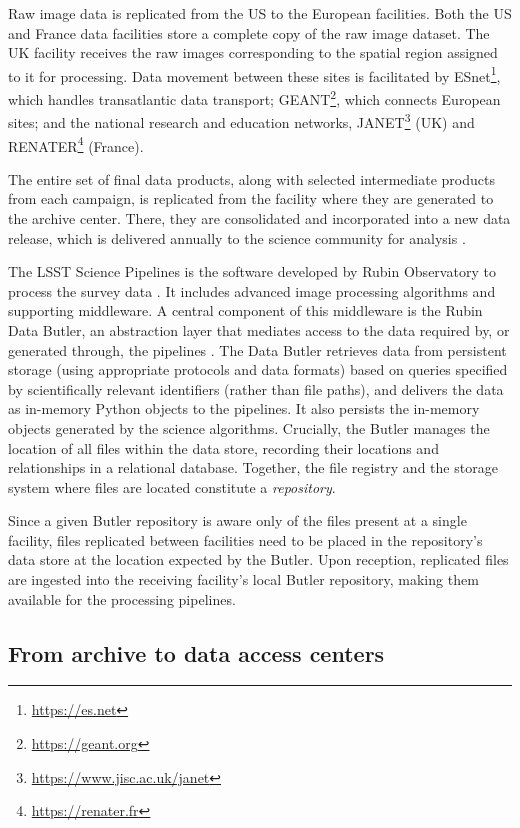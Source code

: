 \documentclass{webofc}
\begin{document}
Raw image data is replicated from the US to the European facilities. Both the US and France data facilities store a complete copy of the raw image dataset. The UK facility receives the raw images corresponding to the spatial region assigned to it for processing. Data movement between these sites is facilitated by ESnet\footnote{\url{https://es.net}}, which handles transatlantic data transport; GEANT\footnote{\url{https://geant.org}}, which connects European sites; and the national research and education networks, JANET\footnote{\url{https://www.jisc.ac.uk/janet}} (UK) and RENATER\footnote{\url{https://renater.fr}} (France).

The entire set of final data products, along with selected intermediate products from each campaign, is replicated from the facility where they are generated to the archive center. There, they are consolidated and incorporated into a new data release, which is delivered annually to the science community for analysis \cite{10.1051_epjconf_202429501042}.

The LSST Science Pipelines is the software developed by Rubin Observatory to process the survey data \cite{bosch-pipelines}. It includes advanced image processing algorithms and supporting middleware. A central component of this middleware is the Rubin Data Butler, an abstraction layer that mediates access to the data required by, or generated through, the pipelines \cite{2022SPIE12189E..11J}. The Data Butler retrieves data from persistent storage (using appropriate protocols and data formats) based on queries specified by scientifically relevant identifiers (rather than file paths), and delivers the data as in-memory Python objects to the pipelines. It also persists the in-memory objects generated by the science algorithms. Crucially, the Butler manages the location of all files within the data store, recording their locations and relationships in a relational database. Together, the file registry and the storage system where files are located constitute a \emph{repository}.

Since a given Butler repository is aware only of the files present at a single facility, files replicated between facilities need to be placed in the repository's data store at the location expected by the Butler. Upon reception, replicated files are ingested into the receiving facility's local Butler repository, making them available for the processing pipelines.


\subsection{From archive to data access centers}
\label{summit-to-data-access-centers}
\end{document}
